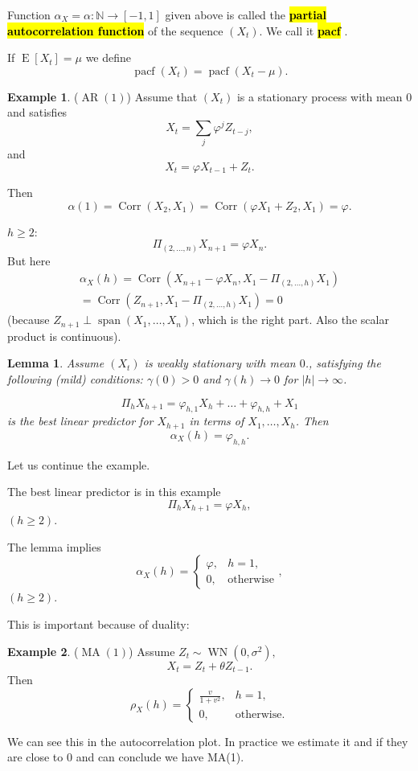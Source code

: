 \documentclass[12pt,a4paper, notitlepage]{book}
\newcommand{\hlc}[2][yellow]{ {\sethlcolor{#1} \hl{#2}} }
\newcommand{\hlcr}[1]{\hlc[lightred]{#1}}
\theoremstyle{definition} %
\newtheorem{example}{Example}[chapter]
\theoremstyle{plain} %
\newtheorem{lemma}{Lemma}[chapter]
\newcommand{\N}{\mathbb N}
\DeclareMathOperator{\E}{E}
\DeclareMathOperator{\Span}{span}
\DeclareMathOperator{\Corr}{Corr}
\DeclareMathOperator{\Pacf}{pacf}
\DeclareMathOperator{\Wn}{WN}
\DeclareMathOperator{\Ar}{AR}
\DeclareMathOperator{\Ma}{MA}
\newcommand{\New}[1]{ {\bf \hlcr{#1} } }
\begin{document}
Function $\alpha_X = \alpha: \N \rightarrow [-1,1]$ given above is called the \New{ partial autocorrelation function} of the sequence $(X_t)$. We call it \New{ pacf}.

If $\E[X_t ] = \mu$ we define 
\[ \Pacf(X_t) = \Pacf(X_t - \mu). \]

\begin{example} ($\Ar(1)$)
Assume that $(X_t)$ is a stationary process with mean $0$ and satisfies 
\[ X_t = \sum_j \varphi^j Z_{t-j} , \]
 and 
\[ X_t = \varphi X_{t-1} + Z_t. \]

Then 
\[ \alpha(1) = \Corr(X_2, X_1) = \Corr(\varphi X_1 + Z_2, X_1) = \varphi . \]

$h \geq 2$:
\[ \Pi_{(2,\dots,n)}X_{n+1} = \varphi X_n. \]
But here 
\begin{align*}  \alpha_X(h) = \Corr(X_{n+1} - \varphi X_n, X_1 - \Pi_{(2, \dots,h)}X_1)  \\ 
 =  \Corr(Z_{n+1}, X_1 - \Pi_{(2, \dots,h)}X_1) = 0 \end{align*}
  (because $Z_{n+1}  \perp \Span(X_1, \dots, X_n)$, which is the right part. Also the scalar product is continuous).


\begin{lemma}
Assume $(X_t)$ is weakly stationary with mean $0$., satisfying the following (mild) conditions: $\gamma(0) > 0$ and $\gamma(h) \rightarrow 0$ for $ |h| \rightarrow   \infty$. 

\[ \Pi_h X_{h+1} = \varphi_{h,1} X_h + \dots + \varphi_{h,h} + X_1\]
 is the best linear predictor for $X_{h+1}$ in terms of $X_1, \dots, X_h$. Then
\[ \alpha_X(h) = \varphi_{h,h}. \] 
\end{lemma}

Let us continue the example. 

The best linear predictor is in this example 
\[ \Pi_h X_{h+1} = \varphi X_h , \] $(h\geq 2)$.

The lemma 
implies 
\[ \alpha_X(h) =  \begin{cases} \varphi, & h =1 , \\  0 , & \text{otherwise} \end{cases} , \] $(h \geq 2)$.
\end{example}




This is important because of duality:

\begin{example} ($\Ma(1)$)
Assume $Z_t \sim \Wn(0, \sigma^2),$ 
\[  X_t = Z_t + \theta Z_{t-1}. \]
Then 
\[ \rho_X(h) = \begin{cases} \frac{v}{1+v^2} , &   h = 1 , \\ 0 , & \text{otherwise} . \end{cases} \]

We can see this in the autocorrelation plot. In practice we estimate it and if they are close to $0$ and can conclude we have MA(1). 
\end{example}
\end{document}
